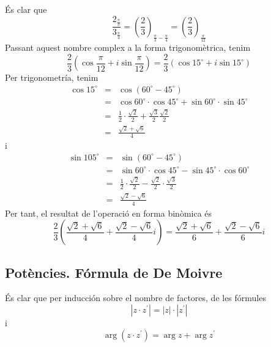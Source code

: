 \begin{solucio}
És clar que
\begin{equation*}
\frac{2_{\frac{\pi }{3}}}{3_{\frac{\pi }{4}}}=\left( \frac{2}{3}\right) _{
\frac{\pi }{3}-\frac{\pi }{4}}=\left( \frac{2}{3}\right) _{\frac{\pi }{12}}
\end{equation*}
Passant aquest nombre complex a la forma trigonomètrica, tenim
\begin{equation*}
\frac{2}{3}\left( \cos \frac{\pi }{12}+i\sin \frac{\pi }{12}\right) =\frac{2
}{3}(\cos 15
^{\circ}
+i\sin 15
^{\circ}
)
\end{equation*}
Per trigonometría, tenim
\begin{eqnarray*}
\cos 15
^{\circ}
&=&\cos (60
^{\circ}
-45
^{\circ}
) \\
&=&\cos 60
^{\circ}
\cdot \cos 45
^{\circ}
+\sin 60
^{\circ}
\cdot \sin 45
^{\circ}
\\
&=&\frac{1}{2}\cdot \frac{\sqrt{2}}{2}+\frac{\sqrt{3}}{2}\frac{\sqrt{2}}{2}
\\
&=&\frac{\sqrt{2}+\sqrt{6}}{4}
\end{eqnarray*}
i
\begin{eqnarray*}
\sin 105
^{\circ}
&=&\sin (60
^{\circ}
-45
^{\circ}
) \\
&=&\sin 60
^{\circ}
\cdot \cos 45
^{\circ}
-\sin 45
^{\circ}
\cdot \cos 60
^{\circ}
\\
&=&\frac{1}{2}\cdot \frac{\sqrt{2}}{2}-\frac{\sqrt{2}}{2}\cdot \frac{\sqrt{3}
}{2} \\
&=&\frac{\sqrt{2}-\sqrt{6}}{4}
\end{eqnarray*}
Per tant, el resultat de l’operació en forma binòmica és
\begin{equation*}
\frac{2}{3}\left( \frac{\sqrt{2}+\sqrt{6}}{4}+\frac{\sqrt{2}-\sqrt{6}}{4}
i\right) =\frac{\sqrt{2}+\sqrt{6}}{6}+\frac{\sqrt{2}-\sqrt{6}}{6}i
\end{equation*}
\end{solucio}

\subsection{Potències. Fórmula de De Moivre}

És clar que per inducción sobre el nombre de factores, de les fórmules
\begin{equation*}
\left\vert z\cdot z^{\prime }\right\vert =\left\vert z\right\vert \cdot
\left\vert z^{\prime }\right\vert
\end{equation*}
i
\begin{equation*}
\arg (z\cdot z^{\prime })=\arg z+\arg z^{\prime }
\end{equation*}

